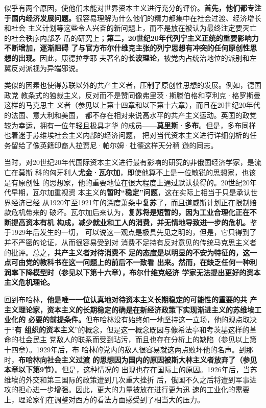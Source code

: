 似乎有两个原因，使他们未能对世界资本主义进行充分的评价。\textbf{首先，他们都专注
  于国内经济发展问题。}很容易理解为什么他们的精力都集中在社会过渡、经济增长和社会
主义计划等这些令人兴奋的新问题上，而不是放在被认为最终注定要灭亡的社会秩序内部矛
盾的研究上；\textbf{第二，20世纪20年代列宁主义正统的重要影响力不断增加，逐渐阻碍
  了与官方布尔什维克主张的列宁思想有冲突的任何原创性思想的出现。}因此，康德拉季耶
夫著名的\textbf{长波理论}，被党内占统治地位的派别和左翼反对派视为异端邪说。

类似的因素也使得苏联以外的共产主义者，压制了原创性思想的发展。例如，德国政党
教条式的独裁主义，反对而不是赞同像弗里茨·斯滕伯格和亨利克·格罗斯曼这样的马克思主
义者（参见以上第十四章和以下第十六章），而且在20世纪20年代的法国、意大利和美国，
都不存在相对来说高水平的共产主义运动。英国的政党较为幸运，拥有一位年轻且极具才华
的成员——\textbf{莫里斯·多布}。但是，多布同样也着迷于苏维埃社会主义内部的经济问题，
把对当代资本主义进行详细剖析的任务留给了像英籍印裔人拉贾尼·帕尔姆·杜德这样天分稍
逊的同志。

当时，对20世纪20年代国际资本主义进行最有影响的研究的非俄国经济学家，是流亡在莫斯
科的匈牙利人\textbf{尤金·瓦尔加}，即使他算不上是一位敏锐的思想家，也该是有原创性
的思想家，他的重要地位在很大程度上通过默认获得的。20世纪20年代早期，瓦尔加重视资
本主义的\textbf{暂时“稳定”问题}，这在实际上相当于只是承认世界经济已经
从1920年至1921年的深度萧条中\textbf{复苏}了，而且道威斯计划正在限制赔款危机带来的
破坏。瓦尔加后来认为，\textbf{复苏将是短暂的，因为工业合理化正在不断提高资本有机
  构成，减少就业和工人的消费，并无情地导致进一步的危机。}鉴于1929年后发生的一切，
可以说这一观点是极具先见之明的，但是，它只得到了并不严密的论证，从而很容易受到对
消费不足持有反对意见的传统马克思主义者的批评。总之，\textbf{共产主义者对待消费不
  足的态度是以明显的不安为特征的，这一点可由党的教科书在这一问题上的前后不一致看
  出来。然而，在缺乏任何一种利润率下降模型时（参见以下第十六章），布尔什维克经济
  学家无法提出更好的资本主义危机理论。}

回到布哈林，\textbf{他是唯一一位认真地对待资本主义长期稳定的可能性的重要的共
产主义理论家，资本主义的长期稳定的确是在新经济政策下实现渐进主义的苏维埃工业化的
必要的前提条件。}但布哈林没有始终如一地坚持这一立场，他的观点取决于“\textbf{有
组织的资本主义}”的概念，但是这一概念既因与像希法亭和考茨基这样的革命的社会民主
党敌人的联系而受到玷污，而且也存在分析上的缺陷（参见以上第十四章）。1929年后，布
哈林的党内的敌人很容易就这两点败坏他的名声。到那时，\textbf{布哈林向社会主义过渡
的思想因为国内的原因被斯大林主义者放弃了（参见本章以下第9节）}。但是，这种情况的
出现也存在国际上的原因。1926年后，当苏维埃的外交和第三国际的政策遭到几次重大挫折
后，俄国不久之后将遭到军事进攻的担心进一步增强。因此，更大的力量被放在进行更为迅
速的工业化的需要上，理论家们在调整对西方的看法方面感受到了相当大的压力。

